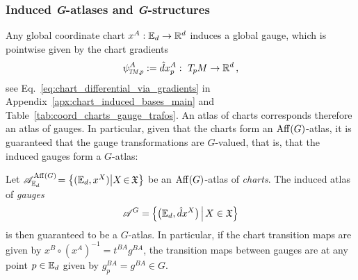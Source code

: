 \subsubsection{Induced \textit{G}-atlases and \textit{G}-structures}
Any global coordinate chart $x^A: \mathbb{E}_d \to \mathbb{R}^d$ induces a global gauge, which is pointwise given by the chart gradients
\begin{align}
    \psiTMp^A := \hat{d}x_p^A :\ \TpM \to \R^d \,,
\end{align}
see Eq.~\eqref{eq:chart_differential_via_gradients} in Appendix~\ref{apx:chart_induced_bases_main} and Table~\ref{tab:coord_charts_gauge_trafos}.
An atlas of charts corresponds therefore an atlas of gauges.
In particular, given that the charts form an $\operatorname{Aff}(G)$-atlas, it is guaranteed that the gauge transformations are $G$-valued, that is, that the induced gauges form a $G$-atlas:
\begin{thm}
\label{thm:AffG_atlas_induced_G_atlas}
    Let ${\mathscr{A}^{\operatorname{Aff}(G)}_{\mathbb{E}_d} \!= \big\{ ( \mathbb{E}_d, x^X ) \big| X \mkern-2mu\in\mkern-2mu \mathfrak{X} \big\}}$ be an $\operatorname{Aff}(G)$-atlas of \emph{charts}.
    The induced atlas of \emph{gauges}
    \begin{align}
        \mathscr{A}^G = \pig\{ \big(\Euc_d, \hat{d}x^X \big) \,\pig|\, X \in \mathfrak{X} \pig\}
    \end{align}
    is then guaranteed to be a $G$-atlas.
    In particular, if the chart transition maps are given by ${x^B \circ (x^A)^{-1}} = t^{BA} g^{BA}$, the transition maps between gauges are at any point $p\in \mathbb{E}_d$ given by ${g_p^{BA} = g^{BA} \in G}$.
\end{thm}
